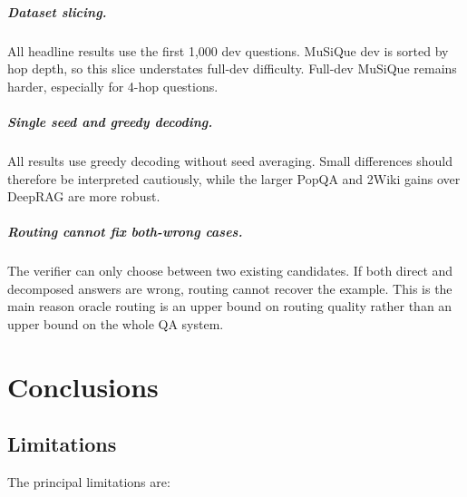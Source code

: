 \documentclass{nthu_thesis}
\begin{document}
\begin{thesiscjk}
\paragraph{Dataset slicing.} All headline results use the first 1{,}000 dev questions. MuSiQue dev is sorted by hop depth, so this slice understates full-dev difficulty. Full-dev MuSiQue remains harder, especially for 4-hop questions.

\paragraph{Single seed and greedy decoding.} All results use greedy decoding without seed averaging. Small differences should therefore be interpreted cautiously, while the larger PopQA and 2Wiki gains over DeepRAG are more robust.

\paragraph{Routing cannot fix both-wrong cases.} The verifier can only choose between two existing candidates. If both direct and decomposed answers are wrong, routing cannot recover the example. This is the main reason oracle routing is an upper bound on routing quality rather than an upper bound on the whole QA system.


\chapter{Conclusions}
\label{ch:conclusion}

\section{Limitations}

The principal limitations are:


\end{thesiscjk}
\end{document}

